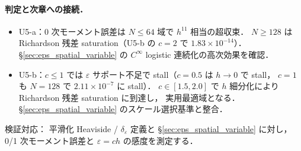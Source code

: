 \paragraph{判定と次章への接続．}
\begin{itemize}\setlength{\itemsep}{0pt}
  \item U5-a：0 次モーメント誤差は $N \le 64$ 域で $h^{11}$ 相当の超収束．
        $N \ge 128$ は Richardson 残差 saturation（U5-b の $c=2$ で $1.83\times 10^{-14}$）．§\ref{sec:eps_spatial_variable} の
        $C^\infty$ logistic 連続化の高次効果を確認．\checkmark
  \item U5-b：$c \le 1$ では $\varepsilon$ サポート不足で stall（$c=0.5$ は $h\!\to\!0$ で stall，
        $c=1$ も $N=128$ で $2.11\!\times\!10^{-7}$ に stall）．
        $c \in [1.5, 2.0]$ で $h$ 細分化により Richardson 残差 saturation に到達し，
        実用最適域となる．§\ref{sec:eps_spatial_variable} のスケール選択基準と整合．\checkmark
\end{itemize}
検証対応：
平滑化 Heaviside / $\delta_\varepsilon$ 定義と §\ref{sec:eps_spatial_variable} に対し，
0/1 次モーメント誤差と $\varepsilon=ch$ の感度を測定する．

\FloatBarrier
